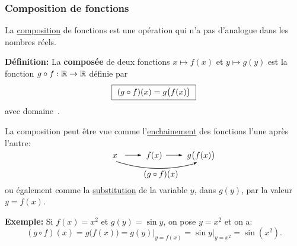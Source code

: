 \begin{frame}
\frametitle{\bf Composition de fonctions}
\medskip 

{\small 
La \underline{composition} de fonctions est une op\'eration qui n'a pas 
d'analogue dans les nombres r\'eels. }
\vspace*{1mm}

\pause
{\bf D\'efinition:} 
La {\bf compos\'ee} de deux fonctions $x\mapsto f(x)$ et $y\mapsto g(y)$ 
est la fonction $g\circ f:\mathbb R\rightarrow\mathbb R$ d\'efinie par
$$
\mbox{\framebox{\ $(g\circ f)(x)=g\big(f(x)\big)$\ }} 
$$
avec domaine\ .
\vspace*{1mm}

\pause
La composition peut \^etre vue comme l'\underline{enchainement} 
des fonctions l'une apr\`es l'autre: 
$$
\begin{picture}(80,30)(10,-10)
\setlength{\unitlength}{1.5pt}
\put(0,10){$x$}
\put(10,12){\vector(1,0){13}}
\put(27,10){$f(x)$}
\put(43,12){\vector(1,0){13}}
\put(60,10){$g\big(f(x)\big)$}
\qbezier(3,7)(34,-3)(65,5)
\put(65,5){\vector(2,1){3}}
\put(25,-5){$(g\circ f)(x)$}
\end{picture}
$$
ou \'egalement comme la \underline{substitution} de la variable $y$, 
dans $g(y)$, par la valeur $y=f(x)$.   
\vspace*{1mm}

\pause
{\small 
{\bf Exemple:}\quad
Si $f(x)=x^2$ et $g(y)=\sin y$, on pose $y=x^2$ et on a: 
$$
(g\circ f)(x) = g\big(f(x)\big) = g(y)\Big|_{y=f(x)} 
= \sin y\Big|_{y=x^2} = \sin(x^2). 
$$
}

\end{frame}


